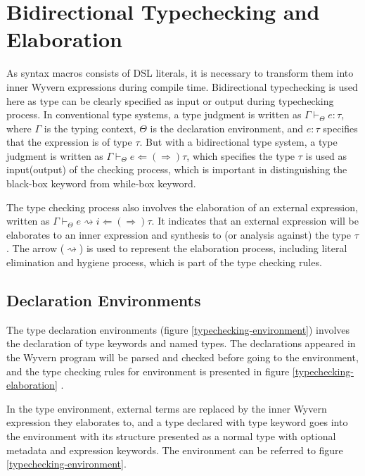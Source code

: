 \documentclass{sig-alternate}
\begin{document}
\section{Bidirectional Typechecking and Elaboration}
As syntax macros consists of DSL literals, it is necessary to transform them into inner Wyvern expressions during compile time. Bidirectional typechecking is used here as type can be clearly specified as input or output during typechecking process. In conventional type systems, a type judgment is written as $\Gamma\vdash_{\Theta} e:\tau$, where $\Gamma$ is the typing context, $\Theta$ is the declaration environment, and $e:\tau$ specifies that the expression is of type $\tau$. But with a bidirectional type system, a type judgment is written as $\Gamma\vdash_{\Theta} e\Leftarrow(\Rightarrow)\tau$, which specifies the type $\tau$ is used as input(output) of the checking process, which is important in distinguishing the black-box keyword from while-box keyword.
\par
The type checking process also involves the elaboration of an external expression, written as $\Gamma\vdash_{\Theta} e\rightsquigarrow i \Leftarrow(\Rightarrow) \tau$. It indicates that an external expression will be elaborates to an inner expression and synthesis to (or analysis against) the type $\tau$. The arrow ($\rightsquigarrow$) is used to represent the elaboration process, including literal elimination and hygiene process, which is part of the type checking rules.

\subsection{Declaration Environments}
The type declaration environments (figure \ref{typechecking-environment}) involves the declaration of type keywords and named types. The declarations appeared in the Wyvern program will be parsed and checked before going to the environment, and the type checking rules for environment is presented in figure \ref{typechecking-elaboration} . 

In the type environment, external terms are replaced by the inner Wyvern expression they elaborates to, and a type declared with type keyword goes into the environment with its structure presented as a normal type with optional metadata and expression keywords. The environment can be referred to figure \ref{typechecking-environment}.
\end{document}
